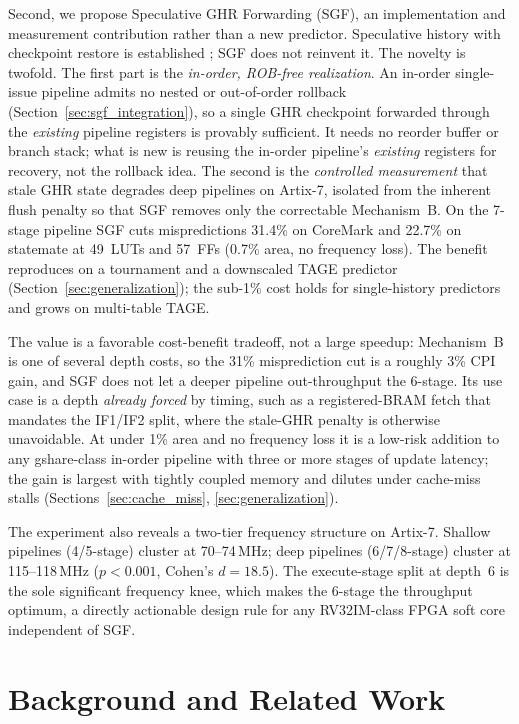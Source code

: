 \documentclass[acmsmall,nonacm,screen]{acmart}
\begin{document}
Second, we propose Speculative GHR Forwarding (SGF), an implementation and measurement contribution rather than a new predictor. Speculative history with checkpoint restore is established \cite{yeh1991two, kessler1999alpha}; SGF does not reinvent it. The novelty is twofold. The first part is the \emph{in-order, ROB-free realization}. An in-order single-issue pipeline admits no nested or out-of-order rollback (Section~\ref{sec:sgf_integration}), so a single GHR checkpoint forwarded through the \emph{existing} pipeline registers is provably sufficient. It needs no reorder buffer or branch stack; what is new is reusing the in-order pipeline's \emph{existing} registers for recovery, not the rollback idea. The second is the \emph{controlled measurement} that stale GHR state degrades deep pipelines on Artix-7, isolated from the inherent flush penalty so that SGF removes only the correctable Mechanism~B. On the 7-stage pipeline SGF cuts mispredictions 31.4\% on CoreMark and 22.7\% on statemate at 49~LUTs and 57~FFs (0.7\% area, no frequency loss). The benefit reproduces on a tournament and a downscaled TAGE predictor (Section~\ref{sec:generalization}); the sub-1\% cost holds for single-history predictors and grows on multi-table TAGE.

The value is a favorable cost-benefit tradeoff, not a large speedup: Mechanism~B is one of several depth costs, so the 31\% misprediction cut is a roughly 3\% CPI gain, and SGF does not let a deeper pipeline out-throughput the 6-stage. Its use case is a depth \emph{already forced} by timing, such as a registered-BRAM fetch that mandates the IF1/IF2 split, where the stale-GHR penalty is otherwise unavoidable. At under 1\% area and no frequency loss it is a low-risk addition to any gshare-class in-order pipeline with three or more stages of update latency; the gain is largest with tightly coupled memory and dilutes under cache-miss stalls (Sections~\ref{sec:cache_miss}, \ref{sec:generalization}).

The experiment also reveals a two-tier frequency structure on Artix-7. Shallow pipelines (4/5-stage) cluster at 70--74\,MHz; deep pipelines (6/7/8-stage) cluster at 115--118\,MHz ($p < 0.001$, Cohen's $d = 18.5$). The execute-stage split at depth~6 is the sole significant frequency knee, which makes the 6-stage the throughput optimum, a directly actionable design rule for any RV32IM-class FPGA soft core independent of SGF.

\section{Background and Related Work}
\label{sec:background}
\end{document}

